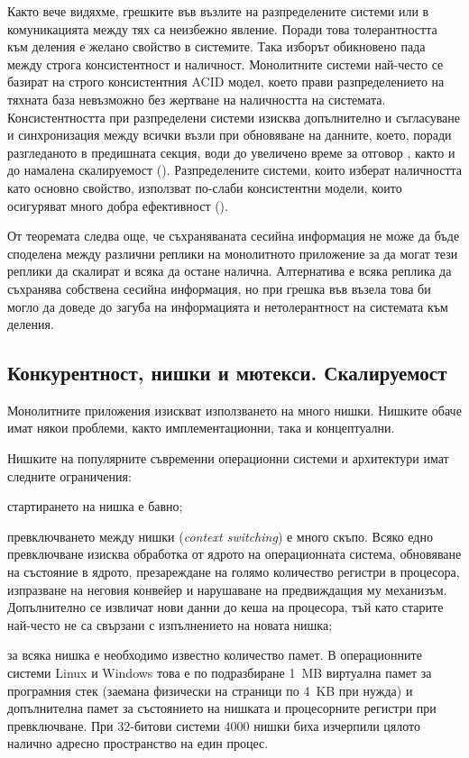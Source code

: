 Както вече видяхме, грешките във възлите на разпределените системи или в комуникацията между тях са неизбежно явление. Поради това толерантността към деления е желано свойство в системите. Така изборът обикновено пада между строга консистентност и наличност. Монолитните системи най-често се базират на строго консистентния ACID модел, което прави разпределението на тяхната база невъзможно без жертване на наличността на системата. Консистентността при разпределени системи изисква допълнително и съгласуване и синхронизация между всички възли при обновяване на данните, което, поради разгледаното в предишната секция, води до увеличено време за отговор \cite{lloyd2014CAPAndConsistency}, както и до намалена скалируемост (). Разпределените системи, които изберат наличността като основно свойство, използват по-слаби консистентни модели, които осигуряват много добра ефективност ().

От теоремата следва още, че съхраняваната сесийна информация не може да бъде споделена между различни реплики на монолитното приложение за да могат тези реплики да скалират и всяка да остане налична. Алтернатива е всяка реплика да съхранява собствена сесийна информация, но при грешка във възела това би могло да доведе до загуба на информацията и нетолерантност на системата към деления.

\subsection{Конкурентност, нишки и мютекси. Скалируемост}
\label{sec:concurrency-threads-scalability}

Монолитните приложения изискват използването на много нишки. Нишките обаче имат някои проблеми, както имплементационни, така и концептуални.

Нишките на популярните съвременни операционни системи и архитектури имат следните ограничения:

\begin{itemize*}
  \item стартирането на нишка е бавно;
  \item превключването между нишки (\emph{context switching}) е много скъпо. Всяко едно превключване изисква обработка от ядрото на операционната система, обновяване на състояние в ядрото, презареждане на голямо количество регистри в процесора, изпразване на неговия конвейер и нарушаване на предвиждащия му механизъм. Допълнително се извличат нови данни до кеша на процесора, тъй като старите най-често не са свързани с изпълнението на новата нишка;
  \item за всяка нишка е необходимо известно количество памет. В операционните системи Linux и Windows това е по подразбиране 1~MB виртуална памет за програмния стек (заемана физически на страници по 4~KB при нужда) и допълнителна памет за състоянието на нишката и процесорните регистри при превключване. При 32-битови системи 4000 нишки биха изчерпили цялото налично адресно пространство на един процес.
\end{itemize*} 

